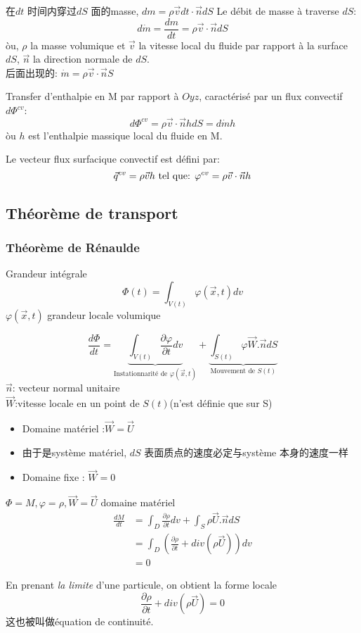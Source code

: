 \documentclass{article}
\begin{document}
在$dt$ 时间内穿过$dS$ 面的masse, $dm = \rho \vec{v} dt \cdot \vec{n} dS$
Le d\'ebit de masse \`a traverse $dS$:
$$d\dot{m} = \dfrac{dm}{dt} = \rho \vec{v} \cdot \vec{n} dS$$
\`ou, $\rho$ la masse volumique et $\vec{v}$ la vitesse local du fluide par rapport \`a la surface $dS$, $\vec{n}$ la direction normale de $dS$.\\
后面出现的: $\dot{m} = \rho \vec{v} \cdot \vec{n}S$

Transfer d'enthalpie en M par rapport \`a $Oyz$, caract\'eris\'e par un flux convectif $d\Phi^{cv}$:
$$ d \Phi^{cv} = \rho \vec{v} \cdot \vec{n} h dS = d\dot{m} h $$
\`ou $h$ est l'enthalpie massique local du fluide en M.

Le vecteur flux surfacique convectif est d\'efini par:
$$ \vec{q}^{cv} = \rho \vec{v} h \text{ tel que: } \varphi^{cv} = \rho \vec{v} \cdot \vec{n} h$$

\subsection{Th\'eor\`eme de transport} 
\subsubsection{Th\'eor\`eme de R\'enaulde}
Grandeur int\'egrale
$$ \Phi(t)=\int_{V(t)} \varphi(\vec{x},t)dv $$
$\varphi(\vec{x},t)$ grandeur locale volumique

$$
\frac{ d\Phi}{dt}=
\underbrace{\int_{V(t)}\frac{\partial \varphi}{\partial t}dv}_{\text{Instationnarit\'e de } \varphi(\vec{x},t)}
+
\underbrace{\int_{S(t)} \varphi \vec{W}.\vec{n}dS}_{\text{Mouvement de }S(t)}
$$
$\vec{n}$: vecteur normal unitaire\\
$\vec{W}$:vitesse locale en un point de $S(t)$(n'est définie que sur S)\\
\begin{itemize}
\item Domaine mat\'eriel :$\vec{W}=\vec{U}$
\item []由于是syst\`eme mat\'eriel, $dS$ 表面质点的速度必定与syst\`eme 本身的速度一样
\item Domaine fixe : $\vec{W}=0$
\end{itemize}

\begin{example}
 $\Phi = M,\varphi=\rho,\vec{ W}=\vec{ U}\text{ domaine mat\'eriel}$
\begin{equation}
	\begin{split}
\frac{ dM}{dt} & =\int_D \frac{\partial \rho}{\partial t}dv+ \int_S \rho \vec{ U}.\vec{ n}dS \\
& = \int_D (\frac{\partial \rho }{\partial t} + div(\rho \vec{ U}))dv \\
& =0	
	\end{split}
\end{equation}

En prenant \emph{la limite} d'une particule, on obtient la forme locale
$$
\frac{\partial \rho }{\partial t} + div(\rho \vec{ U})=0
$$
这也被叫做\'equation de continuit\'e.
\end{example}
\end{document}
